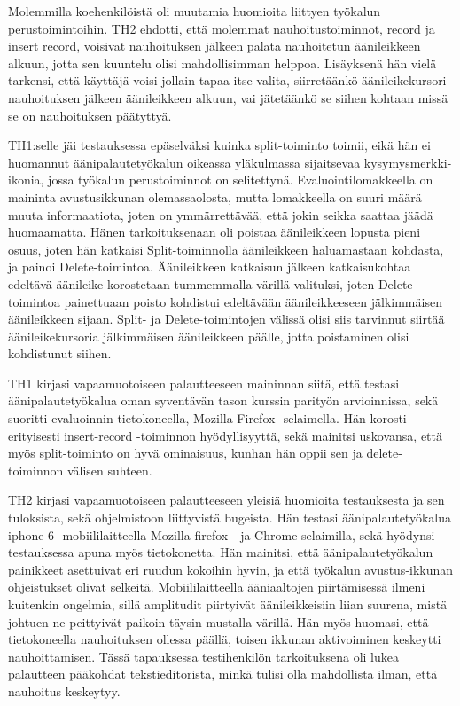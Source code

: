 \documentclass[utf8]{gradu3}
\begin{document}
Molemmilla koehenkilöistä oli muutamia huomioita liittyen työkalun perustoimintoihin. TH2 ehdotti, että molemmat nauhoitustoiminnot, record ja insert record, voisivat nauhoituksen jälkeen palata nauhoitetun äänileikkeen alkuun, jotta sen kuuntelu olisi mahdollisimman helppoa. Lisäyksenä hän vielä tarkensi, että käyttäjä voisi jollain tapaa itse valita, siirretäänkö äänileikekursori nauhoituksen jälkeen äänileikkeen alkuun, vai jätetäänkö se siihen kohtaan missä se on nauhoituksen päätyttyä.

TH1:selle jäi testauksessa epäselväksi kuinka split-toiminto toimii, eikä hän ei huomannut äänipalautetyökalun oikeassa yläkulmassa sijaitsevaa kysymysmerkki-ikonia, jossa työkalun perustoiminnot on selitettynä. Evaluointilomakkeella on maininta avustusikkunan olemassaolosta, mutta lomakkeella on suuri määrä muuta informaatiota, joten on ymmärrettävää, että jokin seikka saattaa jäädä huomaamatta. Hänen tarkoituksenaan oli poistaa äänileikkeen lopusta pieni osuus, joten hän katkaisi Split-toiminnolla äänileikkeen haluamastaan kohdasta, ja painoi Delete-toimintoa. Äänileikkeen katkaisun jälkeen katkaisukohtaa edeltävä äänileike korostetaan tummemmalla värillä valituksi, joten Delete-toimintoa painettuaan poisto kohdistui edeltävään äänileikkeeseen jälkimmäisen äänileikkeen sijaan. Split- ja Delete-toimintojen välissä olisi siis tarvinnut siirtää äänileikekursoria jälkimmäisen äänileikkeen päälle, jotta poistaminen olisi kohdistunut siihen.

TH1 kirjasi vapaamuotoiseen palautteeseen maininnan siitä, että testasi äänipalautetyökalua oman syventävän tason kurssin parityön arvioinnissa, sekä suoritti evaluoinnin tietokoneella, Mozilla Firefox -selaimella. Hän korosti erityisesti insert-record -toiminnon hyödyllisyyttä, sekä mainitsi uskovansa, että myös split-toiminto on hyvä ominaisuus, kunhan hän oppii sen ja delete-toiminnon välisen suhteen. 

TH2 kirjasi vapaamuotoiseen palautteeseen yleisiä huomioita testauksesta ja sen tuloksista, sekä ohjelmistoon liittyvistä bugeista. Hän testasi äänipalautetyökalua iphone 6 -mobiililaitteella Mozilla firefox - ja Chrome-selaimilla, sekä hyödynsi testauksessa apuna myös tietokonetta. Hän mainitsi, että äänipalautetyökalun painikkeet asettuivat eri ruudun kokoihin hyvin, ja että työkalun avustus-ikkunan ohjeistukset olivat selkeitä. Mobiililaitteella ääniaaltojen piirtämisessä ilmeni kuitenkin ongelmia, sillä amplitudit piirtyivät äänileikkeisiin liian suurena, mistä johtuen ne peittyivät paikoin täysin mustalla värillä. Hän myös huomasi, että tietokoneella nauhoituksen ollessa päällä, toisen ikkunan aktivoiminen keskeytti nauhoittamisen. Tässä tapauksessa testihenkilön tarkoituksena oli lukea palautteen pääkohdat tekstieditorista, minkä tulisi olla mahdollista ilman, että nauhoitus keskeytyy.
\end{document}
